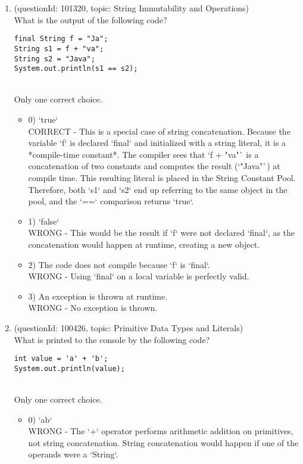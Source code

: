 \documentclass[12pt]{article}
\begin{document}
\begin{enumerate}[label=(\arabic*)]
\begin{itemize}
\end{itemize}
\item (questionId: 101320, topic: String Immutability and Operations) \\ 
What is the output of the following code?
\begin{verbatim}
final String f = "Ja";
String s1 = f + "va";
String s2 = "Java";
System.out.println(s1 == s2);
\end{verbatim}
\\ \noindent Only one correct choice. 
\begin{itemize}
\item 0) `true`
 \\ 
CORRECT - This is a special case of string concatenation. Because the variable `f` is declared `final` and initialized with a string literal, it is a *compile-time constant*. The compiler sees that `f + "va"` is a concatenation of two constants and computes the result (`"Java"`) at compile time. This resulting literal is placed in the String Constant Pool. Therefore, both `s1` and `s2` end up referring to the same object in the pool, and the `==` comparison returns `true`.

\item 1) `false`
 \\ 
WRONG - This would be the result if `f` were not declared `final`, as the concatenation would happen at runtime, creating a new object.

\item 2) The code does not compile because `f` is `final`.
 \\ 
WRONG - Using `final` on a local variable is perfectly valid.

\item 3) An exception is thrown at runtime.
 \\ 
WRONG - No exception is thrown.

\end{itemize}
\item (questionId: 100426, topic: Primitive Data Types and Literals) \\ 
What is printed to the console by the following code?
\begin{verbatim}
int value = 'a' + 'b';
System.out.println(value);
\end{verbatim}
\\ \noindent Only one correct choice. 
\begin{itemize}
\item 0) `ab`
 \\ 
WRONG - The `+` operator performs arithmetic addition on primitives, not string concatenation. String concatenation would happen if one of the operands were a `String`.


\end{itemize}
\end{enumerate}
\end{document}
